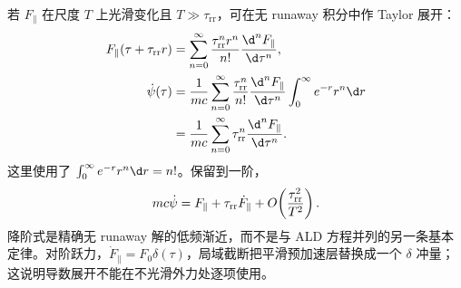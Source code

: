 若 $F_\parallel$ 在尺度 $T$ 上光滑变化且 $T\gg\tau_{\mathrm{rr}}$，可在无 runaway 积分中作 Taylor 展开：
\begin{align*}
 F_\parallel(\tau+\tau_{\mathrm{rr}}r)
 &=\sum_{n=0}^\infty
 {\tau_{\mathrm{rr}}^nr^n\over n!}
 {\d^nF_\parallel\over\d\tau^n},\\
 \dot\psi(\tau)
 &= {1\over mc}
 \sum_{n=0}^\infty
 {\tau_{\mathrm{rr}}^n\over n!}
 {\d^nF_\parallel\over\d\tau^n}
 \int_0^\infty e^{-r}r^n\d r\\
 &= {1\over mc}
 \sum_{n=0}^\infty
 \tau_{\mathrm{rr}}^n
 {\d^nF_\parallel\over\d\tau^n}.
\end{align*}
这里使用了 $\int_0^\infty e^{-r}r^n\d r=n!$。保留到一阶，
\begin{equation*}
 mc\dot\psi
 =F_\parallel+\tau_{\mathrm{rr}}\dot F_\parallel
 +O\!\left({\tau_{\mathrm{rr}}^2\over T^2}\right).
\end{equation*}
降阶式是精确无 runaway 解的低频渐近，而不是与 ALD 方程并列的另一条基本定律。对阶跃力，$\dot F_\parallel=F_0\delta(\tau)$，局域截断把平滑预加速层替换成一个 $\delta$ 冲量；这说明导数展开不能在不光滑外力处逐项使用。

